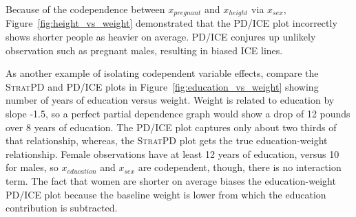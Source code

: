 \documentclass[12pt]{article}
\newcommand{\figref}[1]{Figure~\ref{#1}}
\newcommand{\spd}{\fontfamily{cmr}\textsc{\small StratPD}}
\begin{document}
Because of the codependence between $x_{pregnant}$ and $x_{height}$ via $x_{sex}$, \figref{fig:height_vs_weight} demonstrated that the PD/ICE plot incorrectly shows shorter people as heavier on average. PD/ICE conjures up unlikely observation such as pregnant males, resulting in biased ICE lines.

As another example of isolating codependent variable effects, compare the \spd{} and PD/ICE plots in \figref{fig:education_vs_weight} showing number of years of education versus weight. Weight is related to education by slope -1.5, so a perfect partial dependence graph would show a drop of 12 pounds over 8 years of education. The PD/ICE plot captures only about two thirds of that relationship, whereas, the \spd{} plot gets the true education-weight relationship.  Female observations have at least 12 years of education, versus 10 for males, so $x_{education}$ and $x_{sex}$ are codependent, though, there is no interaction term. The fact that women are shorter on average biases the education-weight PD/ICE plot because the baseline weight is lower from which the education contribution is  subtracted.
\end{document}
